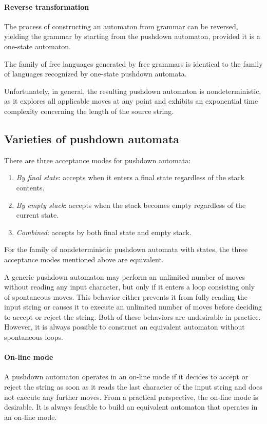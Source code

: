 \paragraph*{Reverse transformation}
The process of constructing an automaton from grammar can be reversed, yielding the grammar by starting from the pushdown automaton, provided it is a one-state automaton.
\begin{property}
    The family of free languages generated by free grammars is identical to the family of languages recognized by one-state pushdown automata.
\end{property}
Unfortunately, in general, the resulting pushdown automaton is nondeterministic, as it explores all applicable moves at any point and exhibits an exponential time complexity concerning the length of the source string.

\subsection{Varieties of pushdown automata}
There are three acceptance modes for pushdown automata:
\begin{enumerate}
    \item \textit{By final state}: accepts when it enters a final state regardless of the stack contents.
    \item \textit{By empty stack}: accepts when the stack becomes empty regardless of the current state.
    \item \textit{Combined}: accepts by both final state and empty stack.
\end{enumerate}
\begin{property}
    For the family of nondeterministic pushdown automata with states, the three acceptance modes mentioned above are equivalent.
\end{property}
A generic pushdown automaton may perform an unlimited number of moves without reading any input character, but only if it enters a loop consisting only of spontaneous moves.
This behavior either prevents it from fully reading the input string or causes it to execute an unlimited number of moves before deciding to accept or reject the string.
Both of these behaviors are undesirable in practice. 
However, it is always possible to construct an equivalent automaton without spontaneous loops.

\paragraph*{On-line mode}
A pushdown automaton operates in an on-line mode if it decides to accept or reject the string as soon as it reads the last character of the input string and does not execute any further moves. 
From a practical perspective, the on-line mode is desirable. 
It is always feasible to build an equivalent automaton that operates in an on-line mode.

